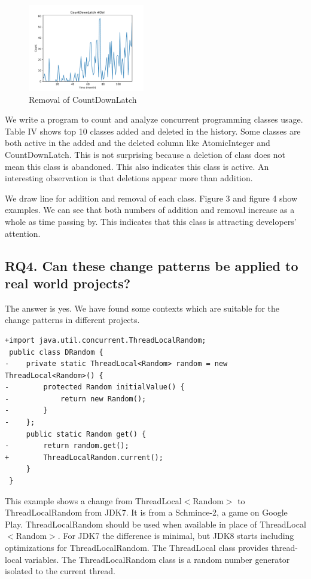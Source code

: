 \documentclass[conference]{IEEEtran}
\begin{document}
\begin{figure}
	\centering
	\includegraphics[height=1.5in]{CountDownLatchMinus}
	\caption{Removal of CountDownLatch}
\end{figure}

We write a program to count and analyze concurrent programming classes usage. Table IV shows top 10 classes added and deleted in the history. Some classes are both active in the added and the deleted column like AtomicInteger and CountDownLatch. This is not surprising because a deletion of class does not mean this class is abandoned. This also indicates this class is active. An interesting observation is that deletions appear more than addition.

We draw line for addition and removal of each class. Figure 3 and figure 4 show examples. We can see that both numbers of addition and removal increase as a whole as time passing by. This indicates that this class is attracting developers' attention.

\subsection{RQ4. Can these change patterns be applied to real world projects?}

The answer is yes. We have found some contexts which are suitable for the change patterns in different projects.

\begin{lstlisting}
+import java.util.concurrent.ThreadLocalRandom;
 public class DRandom {
-    private static ThreadLocal<Random> random = new ThreadLocal<Random>() {
-        protected Random initialValue() {
-            return new Random();
-        }
-    };
     public static Random get() {
-        return random.get();
+        ThreadLocalRandom.current();
     }
 }
\end{lstlisting}

This example shows a change from ThreadLocal$<$Random$>$ to ThreadLocalRandom from JDK7. It is from a Schmince-2, a game on Google Play. ThreadLocalRandom should be used when available in place of ThreadLocal$<$Random$>$. For JDK7 the difference is minimal, but JDK8 starts including optimizations for ThreadLocalRandom. The ThreadLocal class provides thread-local variables. The ThreadLocalRandom class is a random number generator isolated to the current thread.
\end{document}
